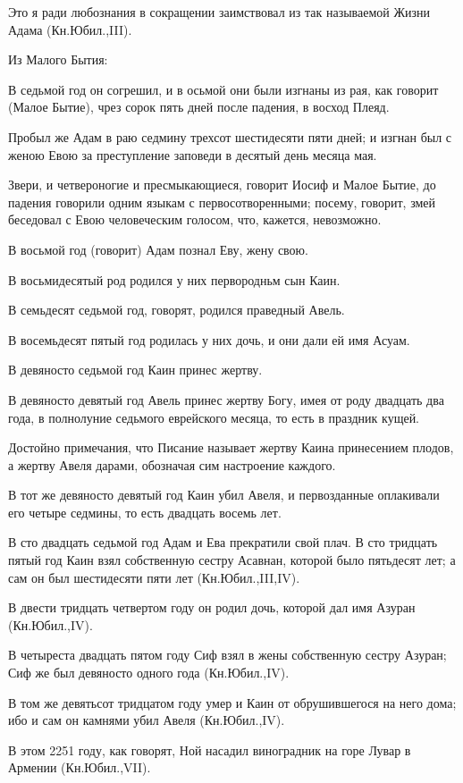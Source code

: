 Это я ради любознания в сокращении заимствовал
из так называемой Жизни Адама (Кн.Юбил.,III).

Из Малого Бытия:

В седьмой год он согрешил, и в осьмой они были
изгнаны из рая, как говорит (Малое Бытие), чрез
сорок пять дней после падения, в восход Плеяд.

Пробыл же Адам в раю седмину трехсот
шестидесяти пяти дней; и изгнан был с женою Евою
за преступление заповеди в десятый день месяца
мая.

Звери, и четвероногие и пресмыкающиеся, говорит
Иосиф и Малое Бытие, до падения говорили одним
языкам с первосотворенными; посему, говорит, змей
беседовал с Евою человеческим голосом, что,
кажется, невозможно.

В восьмой год (говорит) Адам познал Еву, жену
свою.

В восьмидесятый род родился у них первородньм
сын Каин.

В семьдесят седьмой год, говорят, родился
праведный Авель.

В восемьдесят пятый год родилась у них дочь, и
они дали ей имя Асуам.

В девяносто седьмой год Каин принес жертву.

В девяносто девятый год Авель принес жертву
Богу, имея от роду двадцать два года, в полнолуние
седьмого еврейского месяца, то есть в праздник
кущей.

Достойно примечания, что Писание называет
жертву Каина принесением плодов, а жертву Авеля
дарами, обозначая сим настроение каждого.

В тот же девяносто девятый год Каин убил Авеля,
и первозданные оплакивали его четыре седмины, то
есть двадцать восемь лет.

В сто двадцать седьмой год Адам и Ева
прекратили свой плач. В сто тридцать пятый год
Каин взял собственную сестру Асавнан, которой
было пятьдесят лет; а сам он был шестидесяти пяти
лет (Кн.Юбил.,III,IV).

В двести тридцать четвертом году он родил дочь,
которой дал имя Азуран (Кн.Юбил.,IV).

В четыреста двадцать пятом году Сиф взял в жены
собственную сестру Азуран; Сиф же был девяносто
одного года (Кн.Юбил.,IV).

В том же девятьсот тридцатом году умер и Каин от
обрушившегося на него дома; ибо и сам он камнями
убил Авеля (Кн.Юбил.,IV).

В этом 2251 году, как говорят, Ной насадил
виноградник на горе Лувар в Армении (Кн.Юбил.,VII).

